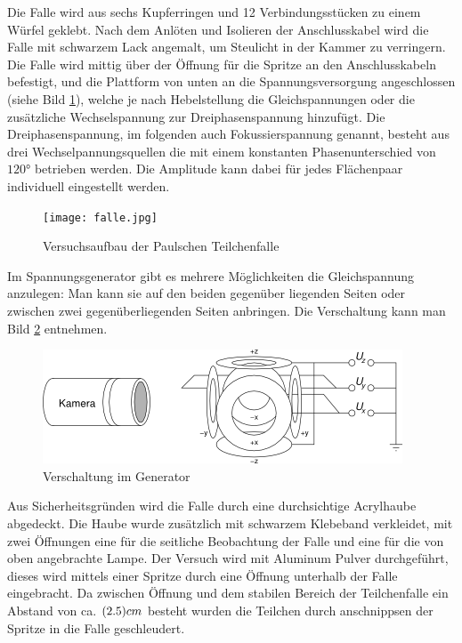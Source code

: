 \documentclass[a4paper,12pt]{article}
\begin{document}
Die Falle wird aus sechs Kupferringen und 12 Verbindungsstücken zu einem Würfel geklebt.
Nach dem Anlöten und Isolieren der Anschlusskabel wird die Falle mit schwarzem Lack angemalt, um Steulicht in der Kammer zu verringern.
Die Falle wird mittig über der Öffnung für die Spritze an den Anschlusskabeln befestigt, und die Plattform von unten an die Spannungsversorgung angeschlossen (siehe Bild \ref{fallenbild}), welche je nach Hebelstellung die Gleichspannungen oder die zusätzliche Wechselspannung zur Dreiphasenspannung hinzufügt.
Die Dreiphasenspannung, im folgenden auch Fokussierspannung genannt, besteht aus drei Wechselpannungsquellen die mit einem konstanten Phasenunterschied von $120°$ betrieben werden. Die Amplitude kann dabei für jedes Flächenpaar individuell eingestellt werden. 

\begin{figure}[htb]
		\centering
		\texttt{[image: falle.jpg]}
		\caption{Versuchsaufbau der Paulschen Teilchenfalle}
		\label{fallenbild}
\end{figure}

Im Spannungsgenerator gibt es mehrere Möglichkeiten die Gleichspannung anzulegen:
Man kann sie auf den beiden gegenüber liegenden Seiten oder zwischen zwei gegenüberliegenden Seiten anbringen.
Die Verschaltung kann man Bild \ref{verschaltung} entnehmen.
\begin{figure}[htb]
		\centering
		\includegraphics{Schaltbild_3Phasen.png}
		\caption{Verschaltung im Generator}
		\label{verschaltung}
\end{figure}

Aus Sicherheitsgründen wird die Falle durch eine durchsichtige Acrylhaube abgedeckt. Die Haube wurde zusätzlich mit schwarzem Klebeband verkleidet, mit zwei Öffnungen eine für die seitliche Beobachtung der Falle und eine für die von oben angebrachte Lampe.  
Der Versuch wird mit Aluminum Pulver durchgeführt, dieses wird mittels einer Spritze durch eine Öffnung unterhalb der Falle eingebracht. Da zwischen Öffnung und dem stabilen Bereich der Teilchenfalle ein Abstand von ca. $\unit(2.5){cm}$  besteht wurden die Teilchen durch anschnippsen der Spritze in die Falle geschleudert.
\end{document}
